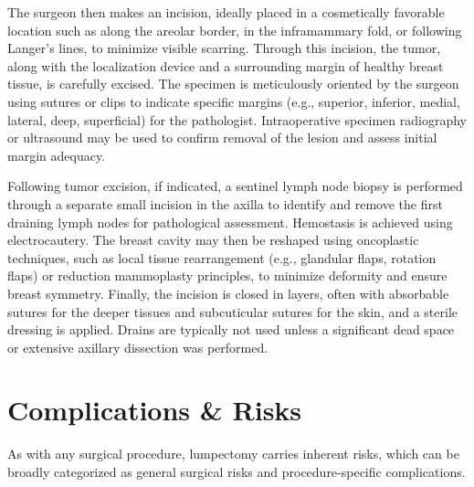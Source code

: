 The surgeon then makes an incision, ideally placed in a cosmetically favorable location such as along the areolar border, in the inframammary fold, or following Langer's lines, to minimize visible scarring. Through this incision, the tumor, along with the localization device and a surrounding margin of healthy breast tissue, is carefully excised. The specimen is meticulously oriented by the surgeon using sutures or clips to indicate specific margins (e.g., superior, inferior, medial, lateral, deep, superficial) for the pathologist. Intraoperative specimen radiography or ultrasound may be used to confirm removal of the lesion and assess initial margin adequacy.

Following tumor excision, if indicated, a sentinel lymph node biopsy is performed through a separate small incision in the axilla to identify and remove the first draining lymph nodes for pathological assessment. Hemostasis is achieved using electrocautery. The breast cavity may then be reshaped using oncoplastic techniques, such as local tissue rearrangement (e.g., glandular flaps, rotation flaps) or reduction mammoplasty principles, to minimize deformity and ensure breast symmetry. Finally, the incision is closed in layers, often with absorbable sutures for the deeper tissues and subcuticular sutures for the skin, and a sterile dressing is applied. Drains are typically not used unless a significant dead space or extensive axillary dissection was performed.

\section*{Complications \& Risks}
As with any surgical procedure, lumpectomy carries inherent risks, which can be broadly categorized as general surgical risks and procedure-specific complications.

